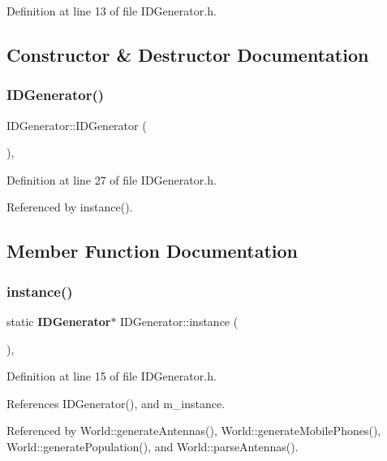 Definition at line 13 of file I\+D\+Generator.\+h.



\subsection{Constructor \& Destructor Documentation}
\mbox{\label{class_i_d_generator_a8209b55f50b469c47f977660a769b1da}} 
\subsubsection{IDGenerator()}
{\footnotesize\ttfamily I\+D\+Generator\+::\+I\+D\+Generator (\begin{DoxyParamCaption}{ }\end{DoxyParamCaption})\hspace{0.3cm}{\ttfamily [inline]}, {\ttfamily [private]}}



Definition at line 27 of file I\+D\+Generator.\+h.



Referenced by instance().



\subsection{Member Function Documentation}
\mbox{\label{class_i_d_generator_ad852c6dadc89e1020e4b3932f5a97bb3}} 
\subsubsection{instance()}
{\footnotesize\ttfamily static \textbf{ I\+D\+Generator}$\ast$ I\+D\+Generator\+::instance (\begin{DoxyParamCaption}{ }\end{DoxyParamCaption})\hspace{0.3cm}{\ttfamily [inline]}, {\ttfamily [static]}}



Definition at line 15 of file I\+D\+Generator.\+h.



References I\+D\+Generator(), and m\+\_\+instance.



Referenced by World\+::generate\+Antennas(), World\+::generate\+Mobile\+Phones(), World\+::generate\+Population(), and World\+::parse\+Antennas().

